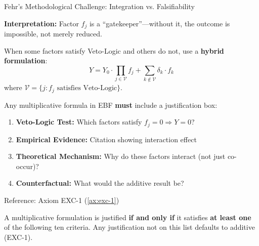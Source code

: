 \begin{chapter}{Fehr's Methodological Challenge: Integration vs. Falsifiability}
\begin{axiom}
\textbf{Interpretation:} Factor $f_j$ is a ``gatekeeper''---without it, the outcome is impossible, not merely reduced.
\end{axiom}

\begin{axiom}
\label{ax:exc-3}
When some factors satisfy Veto-Logic and others do not, use a \textbf{hybrid formulation}:
\begin{equation}
\boxed{
Y = Y_0 \cdot \prod_{j \in \mathcal{V}} f_j + \sum_{k \notin \mathcal{V}} \delta_k \cdot f_k
}
\label{eq:exc-3-hybrid}
\end{equation}
where $\mathcal{V} = \{j : f_j \text{ satisfies Veto-Logic}\}$.
\end{axiom}

\begin{axiom}
\label{ax:exc-4}
Any multiplicative formula in EBF \textbf{must} include a justification box:
\begin{enumerate}[noitemsep]
    \item \textbf{Veto-Logic Test:} Which factors satisfy $f_j = 0 \Rightarrow Y = 0$?
    \item \textbf{Empirical Evidence:} Citation showing interaction effect
    \item \textbf{Theoretical Mechanism:} Why do these factors interact (not just co-occur)?
    \item \textbf{Counterfactual:} What would the additive result be?
\end{enumerate}
Reference: Axiom EXC-1 (\ref{ax:exc-1})
\end{axiom}

\begin{axiom}
\label{ax:exc-5}
A multiplicative formulation is justified \textbf{if and only if} it satisfies \textbf{at least one} of the following ten criteria. Any justification not on this list defaults to additive (EXC-1).


\end{axiom}
\end{chapter}
